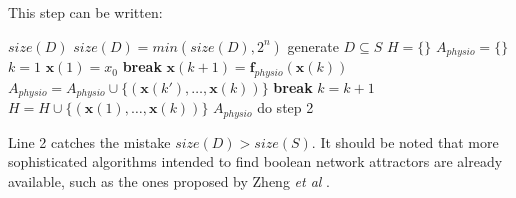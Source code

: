 \documentclass[oneside,a4paper,onecolumn,notitlepage,final]{article}
\begin{document}
This step can be written:
\begin{algorithmic}[1]
\REQUIRE $size(D)$
\STATE $size(D)=min(size(D),2^n)$
\STATE generate $D\subseteq S$
\STATE $H=\lbrace \rbrace$
\STATE $A_{physio}=\lbrace \rbrace$
    \STATE $k=1$
    \STATE $\boldsymbol{x}(1)=x_0$
            \STATE \textbf{break}
        \ENDIF
        \STATE $\boldsymbol{x}(k+1)=\boldsymbol{f}_{physio}(\boldsymbol{x}(k))$
            \STATE $A_{physio}=A_{physio}\cup \lbrace (\boldsymbol{x}(k'),\dots ,\boldsymbol{x}(k))\rbrace$
            \STATE \textbf{break}
        \ENDIF
        \STATE $k=k+1$
    \ENDWHILE
    \STATE $H=H\cup \lbrace (\boldsymbol{x}(1),\dots ,\boldsymbol{x}(k))\rbrace$
\ENDFOR
\ENSURE $A_{physio}$
\STATE do step 2
\end{algorithmic}
Line 2 catches the mistake $size(D)>size(S)$. It should be noted that more sophisticated algorithms intended to find boolean network attractors are already available, such as the ones proposed by Zheng \textit{et al} \cite{zheng2013efficient}.
\end{document}
